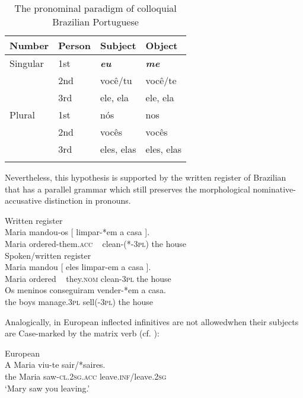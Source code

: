 \documentclass[output=paper]{langsci/langscibook}
\begin{document}
\begin{table}
\caption{\label{tab:moreno:1}The pronominal paradigm of colloquial Brazilian Portuguese}
\begin{tabular}{llll}
\lsptoprule
{Number}   & Person & Subject & Object\\\midrule
{Singular} & 1st & \textbf{\textit{eu}} & \textbf{\textit{me}}\\
           & 2nd & você/tu & você/te\\
           & 3rd & ele, ela & ele, ela\\\midrule
{Plural}   & 1st & nós & nos\\
           & 2nd & vocês & vocês\\
           & 3rd & eles, elas & eles, elas\\
\lspbottomrule
\end{tabular}
\end{table}

Nevertheless, this hypothesis is supported by the written register of Brazilian  that has a parallel grammar which still preserves the morphological nominative-accusative distinction in pronouns.\largerpage[-1]

\ea%
    \label{ex:moreno:24}
    \ea  Written register\\
    \gll Maria mandou-os     [  limpar-*em    a    casa ].   \\
         Maria ordered-them.\textsc{acc}   ~    clean-(*-\textsc{3pl}) the house\\
    \ex  Spoken/written register\\
    \gll Maria mandou [ eles   limpar-em a    casa ].   \\
         Maria ordered  ~  they.\textsc{nom} clean-\textsc{3pl}  the house \\
    \ex  
    \gll Os meninos conseguiram  vender-*em  a    casa. \\
         the boys      manage.\textsc{3pl}    sell(-\textsc{3pl})     the house \\
\z
\z

Analogically, in European  inflected infinitives are not allowed\linebreak when their subjects are Case-marked by the matrix verb (cf. \citealt{Hornstein2008}):

\ea%
         European \label{ex:moreno:25}\\
    \gll A   Maria viu-te           sair/*saires.\\
         the Maria saw-\textsc{cl.2sg.acc} leave.\textsc{inf}/leave.\textsc{2sg}\\
    \glt ‘Mary saw you leaving.’
\z
\end{document}
